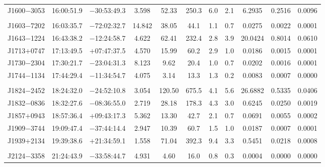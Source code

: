 \begin{landscape}
\begin{table}
\begin{center}
\begin{tabular}{lcccccccccc}
J1600$-$3053& 16:00:51.9  &  $-$30:53:49.3 &  3.598  &  52.33    & 250.3    & 6.0       & 2.1    &  6.2935  &  0.2516  &  0.0096  \\ 
            &             &                &         &           &          &           &        &          &          &          \\ 
J1603$-$7202& 16:03:35.7  &  $-$72:02:32.7 &  14.842 &  38.05    & 44.1     & 1.1       & 0.7    &  0.0275  &  0.0022  &  0.0001  \\ 
J1643$-$1224& 16:43:38.2  &  $-$12:24:58.7 &  4.622  &  62.41    & 232.4    & 2.8       & 3.9    &  20.0424 &  0.8014  &  0.0610  \\
J1713$+$0747& 17:13:49.5  &  $+$07:47:37.5 &  4.570  &  15.99    & 60.2     & 2.9       & 1.0    &  0.0186  &  0.0015  &  0.0001  \\ 
J1730$-$2304& 17:30:21.7  &  $-$23:04:31.3 &  8.123  &  9.62     & 20.4     & 1.0       & 0.7    &  0.0202  &  0.0016  &  0.0001  \\ 
J1744$-$1134& 17:44:29.4  &  $-$11:34:54.7 &  4.075  &  3.14     & 13.3     & 1.3       & 0.2    &  0.0083  &  0.0007  &  0.0000  \\ 
            &             &                &         &           &          &           &        &          &          &          \\ 
J1824$-$2452& 18:24:32.0  &  $-$24:52:10.8 &  3.054  &  120.50   & 675.5    & 4.1       & 5.6    & 26.6882  &  0.5335  &  0.0406  \\ 
J1832$-$0836& 18:32:27.6  &  $-$08:36:55.0 &  2.719  &  28.18    & 178.3    & 4.3       & 3.0    &  0.6245  &  0.0250  &  0.0019  \\ 
J1857$+$0943& 18:57:36.4  &  $+$09:43:17.3 &  5.362  &  13.30    & 42.7     & 2.1       & 0.7    &  0.0691  &  0.0055  &  0.0002  \\ 
J1909$-$3744& 19:09:47.4  &  $-$37:44:14.4 &  2.947  &  10.39    & 60.7     & 1.5       & 1.0    &  0.0187  &  0.0007  &  0.0001  \\ 
J1939$+$2134& 19:39:38.6  &  $+$21:34:59.1 &  1.558  &  71.04    & 392.3    & 9.4       & 3.3    &  0.5451  &  0.0218  &  0.0008  \\ 
            &             &                &         &           &          &           &        &          &          &          \\ 
J2124$-$3358& 21:24:43.9  &  $-$33:58:44.7 &  4.931  &  4.60     & 16.0     & 0.8       & 0.3    &  0.0004  &  0.0000  &  0.0000  \\ 

\end{tabular}
\end{center}
\end{table}
\end{landscape}
